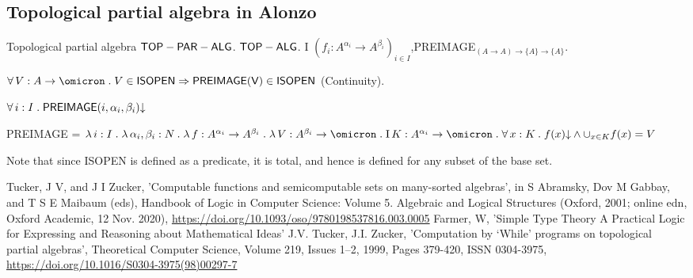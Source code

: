 \documentclass[11pt,fleqn]{article}
\begin{document}
\subsection{Topological partial algebra in Alonzo}

  \begin{theory-ext}{Topological partial algebra}
    {$\mathsf{TOP-PAR-ALG}$.}
    {$\mathsf{TOP-ALG}$.}
    {I}
    {$(f_i : A^{\alpha_i} \rightarrow A^{\beta_i} )_{i \in I}$,PREIMAGE$_{ (A \rightarrow A) \rightarrow \{ A \} \rightarrow \{ A \}}$.}
    {
    \be \setcounter{enumi}{4}
        \item $\cForallX {V}{\cFunTyX{A}{\omicron}} V \in \mName{ISOPEN} \Rightarrow \mName{PREIMAGE(V)} \in \mName{ISOPEN}$ 
        \hfill (Continuity).
        \item $\forall\, i : I \mathrel{.} \mathsf{PREIMAGE} (i, \alpha_i, \beta_i){\downarrow}$
        \item PREIMAGE = $\cFunAbsX {i} {I} {} \cFunAbsX {\alpha_i, \beta_i} {N} {} \cFunAbsX {f} {\cFunTyX{A^{\alpha_i}}{A^{\beta_i}}} {} \cFunAbsX {V} {\cFunTyX{A^{\beta_i}}{\omicron}} {} \cDefDesX {K} {\cFunTyX{A^{\alpha_i}}{\omicron}} {} \cForallX {x}{K} \cAndX {\cIsDefX{f(x)}} {\cup_{x\in K} f(x) = V}$
    \ee
    }
\end{theory-ext}

\begin{cor}
  Note that since ISOPEN is defined as a predicate, it is total, and hence is defined for any subset of the base set.
\end{cor}
 
\begin{thebibliography}{1}
   Tucker, J V, and J I Zucker, 'Computable functions and semicomputable sets on many-sorted algebras', in S Abramsky, Dov M Gabbay, and T S E Maibaum (eds), Handbook of Logic in Computer Science: Volume 5. Algebraic and Logical Structures (Oxford, 2001; online edn, Oxford Academic, 12 Nov. 2020), \url{https://doi.org/10.1093/oso/9780198537816.003.0005}
   Farmer, W, 'Simple Type Theory A Practical Logic for Expressing and Reasoning about Mathematical Ideas'
   J.V. Tucker, J.I. Zucker, 'Computation by ‘While’ programs on topological partial algebras', Theoretical Computer Science, Volume 219, Issues 1–2, 1999, Pages 379-420, ISSN 0304-3975, \url{https://doi.org/10.1016/S0304-3975(98)00297-7}

  \end{thebibliography}

\printbibliography[heading=bibintoc]
\end{document}
